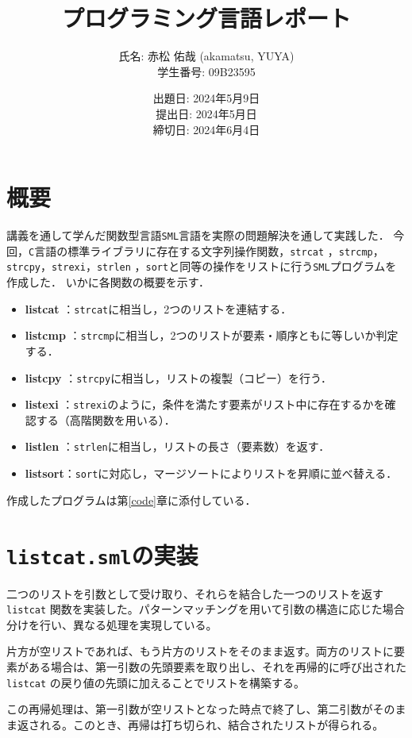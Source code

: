 \documentclass[autodetect-engine,dvi=dvipdfmx,ja=standard,
               a4j,11pt]{bxjsarticle}
\title{プログラミング言語レポート}
\author{氏名: 赤松 佑哉 (akamatsu, YUYA) \\
        学生番号: 09B23595}
\date{出題日: 2024年5月9日 \\
      提出日: 2024年5月日 \\
      締切日: 2024年6月4日 \\}  %
\begin{document}
\maketitle
\section{概要}
講義を通して学んだ関数型言語\verb|SML|言語を実際の問題解決を通して実践した．
今回，\verb|C|言語の標準ライブラリに存在する文字列操作関数，\verb|strcat|
，\verb|strcmp|，\verb|strcpy|，\verb|strexi|，\verb|strlen|
，\verb|sort|と同等の操作をリストに行う\verb|SML|プログラムを作成した．
いかに各関数の概要を示す．
\begin{itemize}
    \item \textbf{listcat} ：\verb|strcat|に相当し，2つのリストを連結する．
    \item \textbf{listcmp} ：\verb|strcmp|に相当し，2つのリストが要素・順序ともに等しいか判定する．
    \item \textbf{listcpy} ：\verb|strcpy|に相当し，リストの複製（コピー）を行う．
    \item \textbf{listexi} ：\verb|strexi|のように，条件を満たす要素がリスト中に存在するかを確認する（高階関数を用いる）．
    \item \textbf{listlen} ：\verb|strlen|に相当し，リストの長さ（要素数）を返す．
    \item \textbf{listsort}：\verb|sort|に対応し，マージソートによりリストを昇順に並べ替える．
\end{itemize}
作成したプログラムは第\ref{code}章に添付している．
\section{\texttt{listcat.sml}の実装}

二つのリストを引数として受け取り、それらを結合した一つのリストを返す \verb|listcat| 関数を実装した。パターンマッチングを用いて引数の構造に応じた場合分けを行い、異なる処理を実現している。

片方が空リストであれば、もう片方のリストをそのまま返す。両方のリストに要素がある場合は、第一引数の先頭要素を取り出し、それを再帰的に呼び出された \verb|listcat| の戻り値の先頭に加えることでリストを構築する。

この再帰処理は、第一引数が空リストとなった時点で終了し、第二引数がそのまま返される。このとき、再帰は打ち切られ、結合されたリストが得られる。
\end{document}
